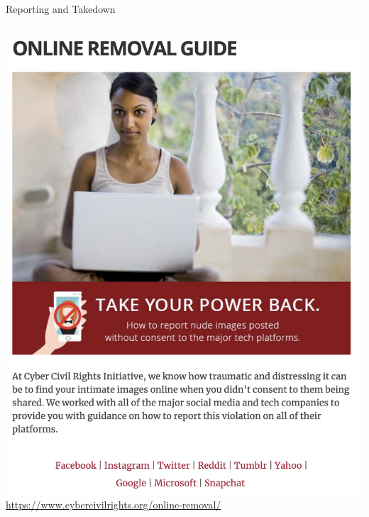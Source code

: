 \documentclass[nobackground,dvipsnames,table,aspectratio=169]{beamer}
\begin{document}
\begin{frame}{Reporting and Takedown}
    \begin{columns}[T]
            \includegraphics[height=0.8\textheight]{ccri-removal-guide}
            \tiny
            \url{https://www.cybercivilrights.org/online-removal/}

\end{columns}
\end{frame}
\end{document}
